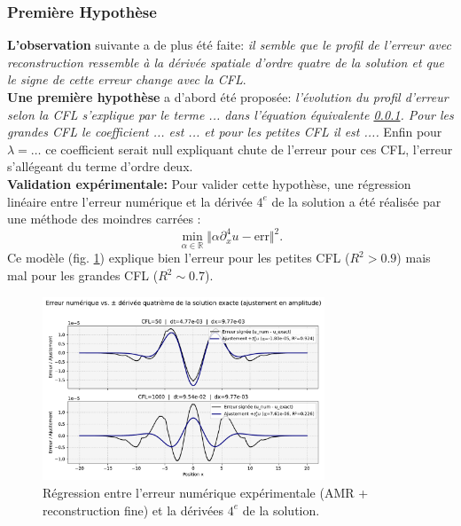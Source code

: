 \subsubsection{Première Hypothèse}
\textbf{L'observation} suivante a de plus été faite: \textit{il semble que le profil de l'erreur avec reconstruction ressemble à la dérivée spatiale d'ordre quatre
de la solution et que le signe de cette erreur change avec la CFL}.\\
\textbf{Une première hypothèse} a d'abord été proposée: \textit{l'évolution du profil d'erreur selon la CFL s'explique par le terme ... dans l'équation équivalente \ref{}.
Pour les grandes CFL le coefficient ... est ... et pour les petites CFL il est ....} Enfin pour $\lambda = \dots$ ce coefficient serait null expliquant 
chute de l'erreur pour ces CFL, l'erreur s'allégeant du terme d'ordre deux.\\
\textbf{Validation expérimentale:} Pour valider cette hypothèse, une régression linéaire entre l'erreur numérique et la dérivée $4^e$ de la solution a été réalisée par 
une méthode des moindres carrées : $$\min_{\alpha \in \mathbb R} \Vert \alpha \partial_x^4 u - \text{err} \Vert^2.$$
Ce modèle (fig. \ref{fig:derive4_vs_err}) explique bien l'erreur pour les petites CFL ($R^2>0.9$) mais mal pour les grandes CFL ($R^2 \sim 0.7$).
\begin{figure}[h!]
    \centering
    \includegraphics[width=0.75\textwidth]{media/4_travail/3/erreur_vs_deriv4.pdf}
    \caption{Régression entre l'erreur numérique expérimentale (AMR + reconstruction fine) et la dérivées $4^e$ de la solution.}
    \label{fig:derive4_vs_err}
\end{figure}
